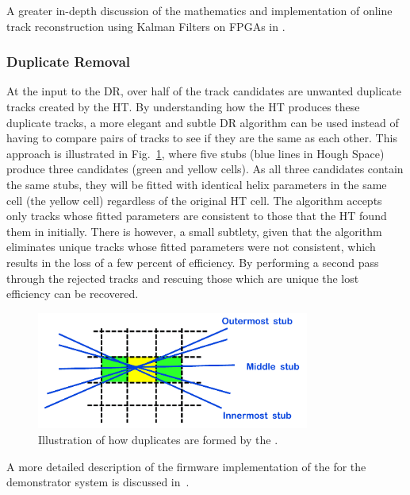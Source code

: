 A greater in-depth discussion of the mathematics and implementation of online track reconstruction using Kalman Filters on FPGAs in \cite{SSummers}.

\subsubsection{Duplicate Removal}
At the input to the DR, over half of the track candidates are unwanted duplicate tracks created by the HT.
By understanding how the HT produces these duplicate tracks, a more elegant and subtle DR algorithm can be used instead of having to compare pairs of tracks to see if they are the same as each other.
This approach is illustrated in Fig.~\ref{fig:DR}, where five stubs (blue lines in Hough Space) produce three candidates (green and yellow cells).
As all three candidates contain the same stubs, they will be fitted with identical helix parameters in the same cell (the yellow cell) regardless of the original HT cell.
The algorithm accepts only tracks whose fitted parameters are consistent to those that the HT found them in initially. There is however, a small subtlety, given that the algorithm eliminates unique tracks whose fitted parameters were not consistent, which results in the loss of a few percent of efficiency. 
By performing a second pass through the rejected tracks and rescuing those which are unique the lost efficiency can be recovered.

\begin{figure}[!h]
\centering
\includegraphics[width=0.80\textwidth]{figs/tk-upgrade/A50_algo.pdf}
\caption{Illustration of how duplicates are formed by the \rphi \HT.}
\label{fig:DR}
\end{figure}

A more detailed description of the firmware implementation of the \DR for the demonstrator system is discussed in~\cite{TMTT_JINST}.

